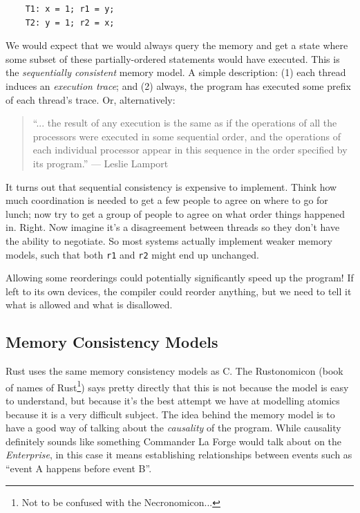 \documentclass[a4paper]{report}
\newcommand{\CPP}{C\nolinebreak\hspace{-.05em}\raisebox{.4ex}{\tiny\bf +}\nolinebreak\hspace{-.10em}\raisebox{.4ex}{\tiny\bf +}}
\def\CPP{{C\nolinebreak[4]\hspace{-.05em}\raisebox{.4ex}{\tiny\bf ++}}}
\begin{document}
\begin{center}
\begin{lstlisting}
    T1: x = 1; r1 = y;
    T2: y = 1; r2 = x;
\end{lstlisting}
\end{center}
We would expect that we would always query the memory and get a state
where some subset of these partially-ordered statements would have executed.
This is the \emph{sequentially consistent} memory model. A simple description: (1) each thread induces an \emph{execution trace}; and (2) always, the program has executed some prefix of each thread's trace. Or, alternatively:

\begin{quote}
``... the result of any execution is the same as if the operations of all the processors were executed in some sequential order, and the operations of each individual processor appear in this sequence in the order specified by its program.'' --- Leslie Lamport
\end{quote}


It turns out that sequential consistency is expensive to implement.
Think how much coordination is needed to get a few people to agree on where to go for lunch; now try to get a group of people to agree on what order things happened in. Right. Now imagine it's a disagreement between threads so they don't have the ability to negotiate. So most systems actually implement weaker memory models, such that both {\tt r1} and {\tt r2} might end up unchanged.

Allowing some reorderings could potentially significantly speed up the program! If left to its own devices, the compiler could reorder anything, but we need to tell it what is allowed and what is disallowed. 

\subsection*{Memory Consistency Models}

Rust uses the same memory consistency models as \CPP. The Rustonomicon (book of names of Rust\footnote{Not to be confused with the Necronomicon...}) says pretty directly that this is not because the model is easy to understand, but because it's the best attempt we have at modelling atomics because it is a very difficult subject. The idea behind the memory model is to have a good way of talking about the \textit{causality} of the program. While causality definitely sounds like something Commander La Forge would talk about on the \textit{Enterprise}, in this case it means establishing relationships between events such as ``event A happens before event B''. 
\end{document}
